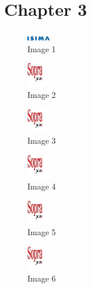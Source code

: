 \cleardoublepage

\chapter{Chapter 3}



\begin{figure}[!h]
  \center
  \includegraphics[width=1cm]{img/ISIMA_logo.png}
  \caption{Image 1}
\end{figure}

\begin{figure}[!h]
  \center
  \includegraphics[width=1cm]{img/test.jpg}
  \caption{Image 2}
\end{figure}

\begin{figure}[!h]
  \center
  \includegraphics[width=1cm]{img/test.jpg}
  \caption{Image 3}
\end{figure}

\begin{figure}[!h]
  \center
  \includegraphics[width=1cm]{img/test.jpg}
  \caption{Image 4}
\end{figure}

\begin{figure}[!h]
  \center
  \includegraphics[width=1cm]{img/test.jpg}
  \caption{Image 5}
\end{figure}

\begin{figure}[!h]
  \center
  \includegraphics[width=1cm]{img/test.jpg}
  \caption{Image 6}
\end{figure}

